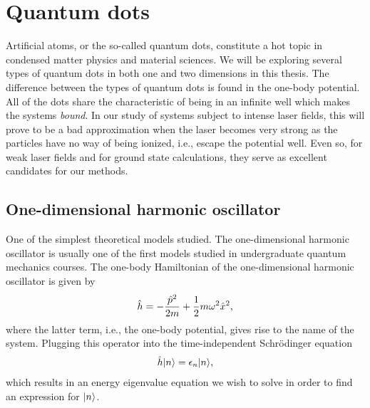 \section{Quantum dots}
    Artificial atoms, or the so-called quantum dots, constitute a hot topic in
    condensed matter physics and material sciences. We will be exploring
    several types of quantum dots in both one and two dimensions in this
    thesis. The difference between the types of quantum dots is found in the
    one-body potential. All of the dots share the characteristic of being in an
    infinite well which makes the systems \emph{bound}. In our study of systems
    subject to intense laser fields, this will prove to be a bad approximation
    when the laser becomes very strong as the particles have no way of being
    ionized, i.e., escape the potential well.  Even so, for weak laser fields
    and for ground state calculations, they serve as excellent candidates for
    our methods.

    \subsection{One-dimensional harmonic oscillator}
        One of the simplest theoretical models studied. The one-dimensional
        harmonic oscillator is usually one of the first models studied in
        undergraduate quantum mechanics courses. The one-body Hamiltonian of the
        one-dimensional harmonic oscillator is given by
        \begin{align}
            \hat{h} = -\frac{\hat{p}^2}{2m} + \frac{1}{2} m\omega^2 \hat{x}^2,
            \label{eq:1dho-hamiltonian}
        \end{align}
        where the latter term, i.e., the one-body potential, gives rise to the
        name of the system. Plugging this operator into the time-independent
        Schrödinger equation
        \begin{gather}
            \hat{h}| n \rangle = \epsilon_n| n \rangle,
        \end{gather}
        which results in an energy eigenvalue equation we wish to solve in order
        to find an expression for $| n \rangle$.

